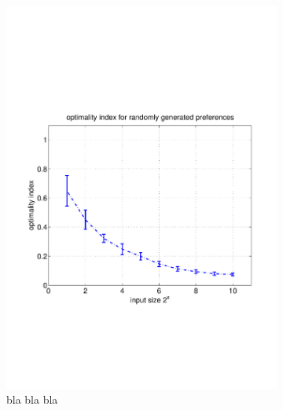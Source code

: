 \documentclass[11pt]{article}
\begin{document}
\begin{figure}[t]
	\centering
	\begin{subfigure}[b]{0.4\textwidth}
	  \includegraphics[trim=0 180 0 180, clip, width=\textwidth]{../figures/figure_14}
	  \caption{bla bla bla}
	  \label{fig:optimality1}
	\end{subfigure}
  \begin{subfigure}[b]{0.4\textwidth}

\end{subfigure}
\end{figure}
\end{document}
